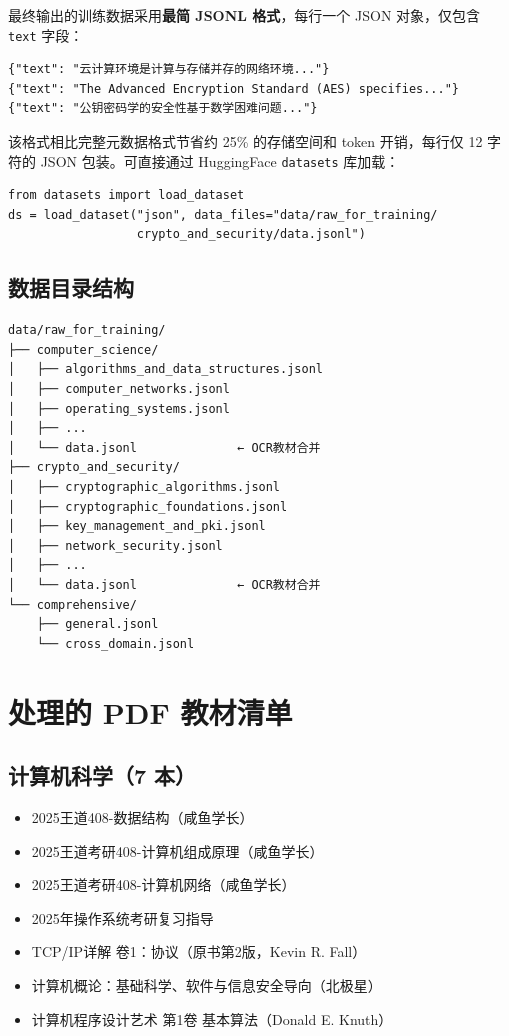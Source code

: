 \documentclass[12pt,a4paper]{ctexart}
\begin{document}
最终输出的训练数据采用\textbf{最简 JSONL 格式}，每行一个 JSON 对象，仅包含 \texttt{text} 字段：

\begin{verbatim}
{"text": "云计算环境是计算与存储并存的网络环境..."}
{"text": "The Advanced Encryption Standard (AES) specifies..."}
{"text": "公钥密码学的安全性基于数学困难问题..."}
\end{verbatim}

该格式相比完整元数据格式节省约 25\% 的存储空间和 token 开销，每行仅 12 字符的 JSON 包装。可直接通过 HuggingFace \texttt{datasets} 库加载：

\begin{verbatim}
from datasets import load_dataset
ds = load_dataset("json", data_files="data/raw_for_training/
                  crypto_and_security/data.jsonl")
\end{verbatim}

\subsection{数据目录结构}

\begin{verbatim}
data/raw_for_training/
├── computer_science/
│   ├── algorithms_and_data_structures.jsonl
│   ├── computer_networks.jsonl
│   ├── operating_systems.jsonl
│   ├── ...
│   └── data.jsonl              ← OCR教材合并
├── crypto_and_security/
│   ├── cryptographic_algorithms.jsonl
│   ├── cryptographic_foundations.jsonl
│   ├── key_management_and_pki.jsonl
│   ├── network_security.jsonl
│   ├── ...
│   └── data.jsonl              ← OCR教材合并
└── comprehensive/
    ├── general.jsonl
    └── cross_domain.jsonl
\end{verbatim}

\section{处理的 PDF 教材清单}

\subsection{计算机科学（7 本）}

\begin{itemize}
    \item 2025王道408-数据结构（咸鱼学长）
    \item 2025王道考研408-计算机组成原理（咸鱼学长）
    \item 2025王道考研408-计算机网络（咸鱼学长）
    \item 2025年操作系统考研复习指导
    \item TCP/IP详解 卷1：协议（原书第2版，Kevin R. Fall）
    \item 计算机概论：基础科学、软件与信息安全导向（北极星）
    \item 计算机程序设计艺术 第1卷 基本算法（Donald E. Knuth）
\end{itemize}
\end{document}
